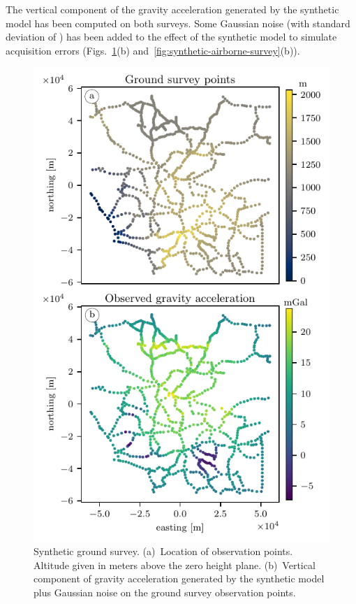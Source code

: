 \documentclass[twocolumn]{article}
\begin{document}
The vertical component of the gravity acceleration generated by the synthetic
model has been computed on both surveys.
Some Gaussian noise (with standard deviation of \SurveyNoise{}) has been added
to the effect of the synthetic model to simulate acquisition errors
(Figs.~\ref{fig:synthetic-ground-survey}(b)
and~\ref{fig:synthetic-airborne-survey}(b)).

\begin{figure}
    \includegraphics[width=\linewidth]{figs/ground-survey.pdf}
    \caption{
        Synthetic ground survey.
        (a)~Location of observation points. Altitude given in meters above the
            zero height plane.
        (b)~Vertical component of gravity acceleration generated by the
            synthetic model plus Gaussian noise on the ground survey
            observation points.
    }
    \label{fig:synthetic-ground-survey}
\end{figure}
\end{document}
